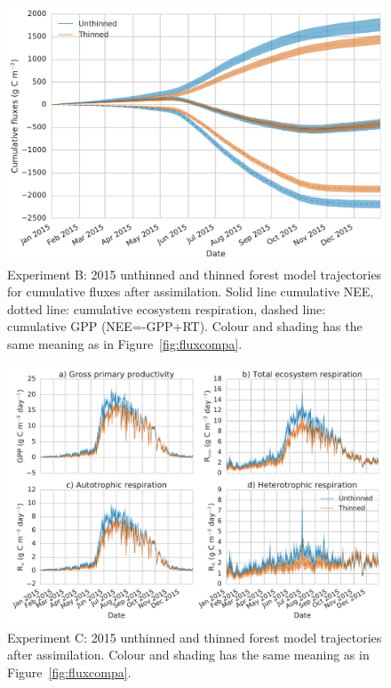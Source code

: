   \begin{figure}
 \noindent\includegraphics[width=40pc]{chapter/chapter7/cum_fluxb.pdf}
\caption{Experiment B: 2015 unthinned and thinned forest model trajectories for cumulative fluxes after assimilation. Solid line cumulative NEE, dotted line: cumulative ecosystem respiration, dashed line: cumulative GPP (NEE=-GPP+RT). Colour and shading has the same meaning as in Figure~\ref{fig:fluxcompa}.}
 \label{fig:fluxcumb}
 \end{figure}
 
  \begin{figure}
 \noindent\includegraphics[width=40pc]{chapter/chapter7/flux_compc.pdf}
\caption{Experiment C: 2015 unthinned and thinned forest model trajectories after assimilation. Colour and shading has the same meaning as in Figure~\ref{fig:fluxcompa}.}
 \label{fig:fluxcompc}
 \end{figure}
 
